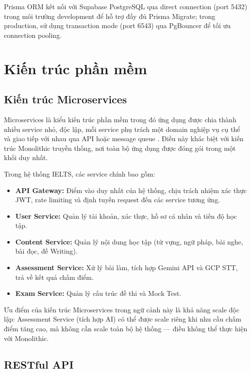 \documentclass[a4paper,12pt]{extreport}
\begin{document}
Prisma ORM kết nối với Supabase PostgreSQL qua direct connection (port 5432) trong môi trường development để hỗ trợ đầy đủ Prisma Migrate; trong production, sử dụng transaction mode (port 6543) qua PgBouncer để tối ưu connection pooling.

\section{Kiến trúc phần mềm}

\subsection{Kiến trúc Microservices}

Microservices là kiểu kiến trúc phần mềm trong đó ứng dụng được chia thành nhiều service nhỏ, độc lập, mỗi service phụ trách một domain nghiệp vụ cụ thể và giao tiếp với nhau qua API hoặc message queue \cite{newman2015microservices}. Điều này khác biệt với kiến trúc Monolithic truyền thống, nơi toàn bộ ứng dụng được đóng gói trong một khối duy nhất.

Trong hệ thống IELTS, các service chính bao gồm:

\begin{itemize}
    \item \textbf{API Gateway:} Điểm vào duy nhất của hệ thống, chịu trách nhiệm xác thực JWT, rate limiting và định tuyến request đến các service tương ứng.
    \item \textbf{User Service:} Quản lý tài khoản, xác thực, hồ sơ cá nhân và tiến độ học tập.
    \item \textbf{Content Service:} Quản lý nội dung học tập (từ vựng, ngữ pháp, bài nghe, bài đọc, đề Writing).
    \item \textbf{Assessment Service:} Xử lý bài làm, tích hợp Gemini API và GCP STT, trả về kết quả chấm điểm.
    \item \textbf{Exam Service:} Quản lý cấu trúc đề thi và Mock Test.
\end{itemize}

Ưu điểm của kiến trúc Microservices trong ngữ cảnh này là khả năng scale độc lập: Assessment Service (tích hợp AI) có thể được scale riêng khi nhu cầu chấm điểm tăng cao, mà không cần scale toàn bộ hệ thống — điều không thể thực hiện với Monolithic.

\subsection{RESTful API}
\end{document}
